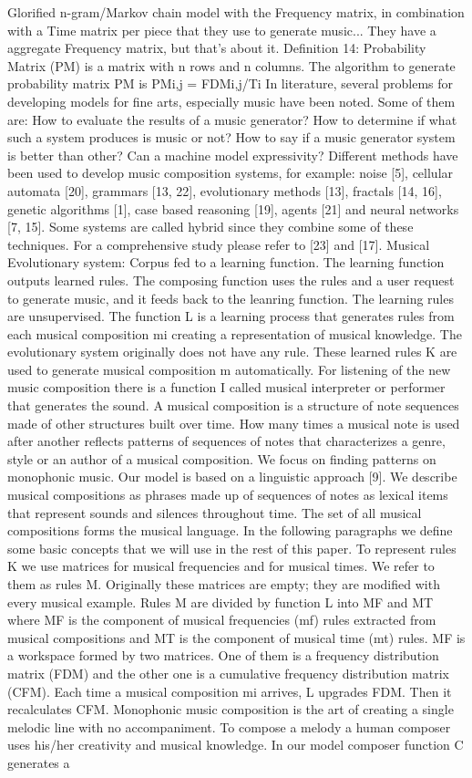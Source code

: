\cite{GarciaSalas2011} Glorified n-gram/Markov chain model with the Frequency matrix, in combination with a Time matrix per piece that they use to generate music...
They have a aggregate Frequency matrix, but that's about it. Definition 14: Probability Matrix (PM) is a matrix with n rows and n columns. The algorithm to generate probability matrix PM is PMi,j = FDMi,j/Ti
In literature, several problems for developing models for fine arts, especially music have been noted. Some of them are: How to evaluate the results of a music generator? How to determine if what such a system produces is music or not? How to say if a music generator system is better than other? Can a machine model expressivity? Different methods have been used to develop music composition systems, for example: noise [5], cellular automata [20], grammars [13, 22], evolutionary methods [13], fractals [14, 16], genetic algorithms [1], case based reasoning [19], agents [21] and neural networks [7, 15]. Some systems are called hybrid since they combine some of these techniques. For a comprehensive study please refer to [23] and [17]. Musical Evolutionary system: Corpus fed to a learning function. The learning function outputs learned rules. The composing function uses the rules and a user request to generate music, and it feeds back to the leanring function. The learning rules are unsupervised. The function L is a learning process that generates rules from each musical composition mi creating a representation of musical knowledge. The evolutionary system originally does not have any rule. These learned rules K are used to generate musical composition m automatically. For listening of the new music composition there is a function I called musical interpreter or performer that generates the sound. A musical composition is a structure of note sequences made of other structures built over time. How many times a musical note is used after another reflects patterns of sequences of notes that characterizes a genre, style or an author of a musical composition. We focus on finding patterns on monophonic music. Our model is based on a linguistic approach [9]. We describe musical compositions as phrases made up of sequences of notes as lexical items that represent sounds and silences throughout time. The set of all musical compositions forms the musical language. In the following paragraphs we define some basic concepts that we will use in the rest of this paper. To represent rules K we use matrices for musical frequencies and for musical times. We refer to them as rules M. Originally these matrices are empty; they are modified with every musical example. Rules M are divided by function L into MF and MT where MF is the component of musical frequencies (mf) rules extracted from musical compositions and MT is the component of musical time (mt) rules. MF is a workspace formed by two matrices. One of them is a frequency distribution matrix (FDM) and the other one is a cumulative frequency distribution matrix (CFM). Each time a musical composition mi arrives, L upgrades FDM. Then it recalculates CFM. Monophonic music composition is the art of creating a single melodic line with no accompaniment. To compose a melody a human composer uses his/her creativity and musical knowledge. In our model composer function C generates a 
